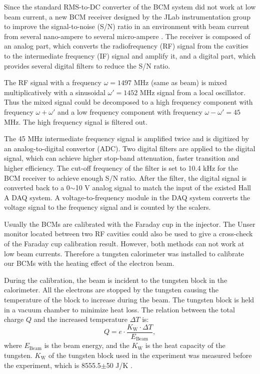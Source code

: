 Since the standard RMS-to-DC converter of the BCM system \cite{Denard2001} did not work at low beam current, a new BCM receiver designed by the JLab instrumentation group to improve the signal-to-noise (S/N) ratio in an environment with beam current from several nano-ampere to several micro-ampere \cite{Musson2012}. The receiver is composed of an analog part, which converts the radiofrequency (RF) signal from the cavities to the intermediate frequency (IF) signal and amplify it, and a digital part, which provides several digital filters to reduce the S/N ratio.

The RF signal with a frequency $\omega=1497$ MHz (same as beam) is mixed multiplicatively with a sinusoidal $\omega'=1452$ MHz signal from a local oscillator. Thus the mixed signal could be decomposed to a high frequency component with frequency $\omega+\omega'$ and a low frequency component with frequency $\omega-\omega'=45$ MHz. The high frequency signal is filtered out.

The 45 MHz intermediate frequency signal is amplified twice and is digitized by an analog-to-digital convertor (ADC). Two digital filters are applied to the digital signal, which can achieve higher stop-band attenuation, faster transition and higher efficiency. The cut-off frequency of the filter is set to 10.4 kHz for the BCM receiver to achieve enough S/N ratio. After the filter, the digital signal is converted back to a 0$\sim$10 V analog signal to match the input of the existed Hall A DAQ system. A voltage-to-frequency module in the DAQ system converts the voltage signal to the frequency signal and is counted by the scalers.

Usually the BCMs are calibrated with the Faraday cup in the injector. The Unser monitor located between two RF cavities could also be used to give a cross-check of the Faraday cup calibration result. However, both methods can not work at low beam currents. Therefore a tungsten calorimeter \cite{Bevins2005} was installed to calibrate our BCMs with the heating effect of the electron beam.

During the calibration, the beam is incident to the tungsten block in the calorimeter. All the electrons are stopped by the tungsten causing the temperature of the block to increase during the beam. The tungsten block is held in a vacuum chamber to minimize heat loss. The relation between the total charge $Q$ and the increased temperature $\Delta T$ is:
\begin{equation} \label{C5S2SS2E1}
Q = e\cdot\frac{K_{\mathrm{W}}\cdot\Delta T}{E_{\mathrm{Beam}}},
\end{equation}
where $E_{\mathrm{Beam}}$ is the beam energy, and the $K_{\mathrm{W}}$ is the heat capacity of the tungsten. $K_{\mathrm{W}}$ of the tungsten block used in the experiment was measured before the experiment, which is 8555.5$\pm$50 J/K \cite{CTUNGSTEN}.

